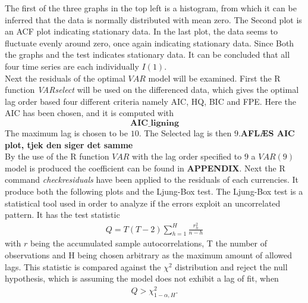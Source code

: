 \noindent The first of the three graphs in the top left is a histogram, from which it can be inferred that the data is normally distributed with mean zero. The Second plot is an ACF plot indicating stationary data. In the last plot, the data seems to fluctuate evenly around zero, once again indicating stationary data.
Since Both the graphs and the test indicates stationary data. It can be concluded that all four time series are each individually $I(1)$.\\

\noindent Next the residuals of the optimal $VAR$ model will be examined. First the R function \textit{VARselect} will be used on the differenced data, which gives the optimal lag order based four different criteria namely AIC, HQ, BIC and FPE. Here the AIC has been chosen, and it is computed with
\begin{equation*}
    \textbf{AIC\_ligning}
\end{equation*}
The maximum lag is chosen to be $10$. The Selected lag is then $9$.\textbf{AFLÆS AIC plot, tjek den siger det samme}\\
By the use of the R function $VAR$ with the lag order specified to $9$ a $VAR(9)$ model is produced the coefficient can be found in \textbf{APPENDIX}. Next the R command \textit{checkresiduals} have been applied to the residuals of each currencies. It produce both the following plots and the Ljung-Box test. The Ljung-Box test is a statistical tool used in order to analyze if the errors exploit an uncorrelated pattern. It has the test statistic 
\begin{align*}
    Q=T(T-2)\sum^H_{h=1}\frac{r^2_{h}}{n-h}
\end{align*}
with $r$ being the accumulated sample autocorrelations, T the number of observations and H being chosen arbitrary as the maximum amount of allowed lags. This statistic is compared against the $\chi^2$ distribution and reject the null hypothesis, which is assuming the model does not exhibit a lag of fit, when
\begin{align*}
    Q>\chi^2_{1-\alpha,H}.
\end{align*}

